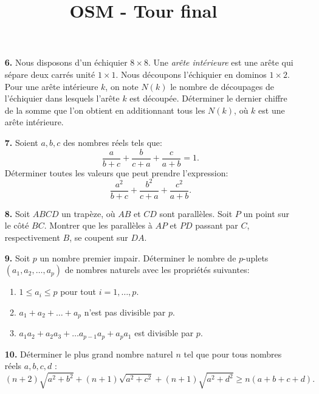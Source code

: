 \documentclass[language=french,style=exam]{smo}
\title{OSM - Tour final}
\begin{document}
\begin{enumerate}

\item[\textbf{6.}] 
Nous disposons d'un échiquier $8 \times 8$. Une \emph{arête intérieure} est une arête qui sépare deux carrés unité $1 \times 1$. Nous découpons l'échiquier en dominos $1 \times 2$. Pour une arête intérieure $k$, on note $N(k)$ le nombre de découpages de l'échiquier dans lesquels l'arête $k$ est découpée. Déterminer le dernier chiffre de la somme que l'on obtient en additionnant tous les $N(k)$, où $k$ est une arête intérieure.

\bigskip

\item[\textbf{7.}] Soient $a,b,c$ des nombres réels tels que:
\[
\frac{a}{b+c}+\frac{b}{c+a}+\frac{c}{a+b} = 1.
\]
Déterminer toutes les valeurs que peut prendre l'expression:
\[
\frac{a^2}{b+c}+\frac{b^2}{c+a}+\frac{c^2}{a+b}.
\]

\bigskip

\item[\textbf{8.}] Soit $ABCD$ un trapèze, où $AB$ et $CD$ sont parallèles. Soit $P$ un point sur le côté $BC$. Montrer que les parallèles à $AP$ et $PD$ passant par $C$, respectivement $B$, se coupent sur $DA$.

\bigskip

\item[\textbf{9.}] Soit $p$ un nombre premier impair. Déterminer le nombre de $p$-uplets  $(a_1,a_2,\dots,a_p)$ de nombres naturels avec les propriétés suivantes:
\begin{enumerate}[1)]
\item $1\leq a_i\leq p$ pour tout $i=1,\dots,p$.
\item $a_1+a_2+\dots +a_p$ n'est pas divisible par $p$.
\item $a_1a_2 + a_2a_3 +\dots a_{p-1}a_p + a_pa_1$ est divisible par $p$.
\end{enumerate}

\bigskip

\item[\textbf{10.}] Déterminer le plus grand nombre naturel $n$ tel que pour tous nombres réels $a,b,c,d$ :
\[
(n+2) \sqrt{a^2+b^2} + (n+1) \sqrt{a^2+c^2} + (n+1)\sqrt{a^2+d^2} \geq n(a+b+c+d).
\]

\bigskip

\end{enumerate}

\vspace{1cm}

\end{document}
